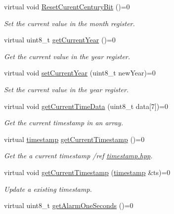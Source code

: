 \begin{DoxyCompactItemize}
virtual void \mbox{\hyperlink{classreal_time_clock_a50e19a6b0aef44719e91e3e753da0dce}{Reset\+Curent\+Century\+Bit}} ()=0
\begin{DoxyCompactList}\small\item\em Set the current value in the month register. \end{DoxyCompactList}\item 
virtual uint8\+\_\+t \mbox{\hyperlink{classreal_time_clock_a0cb99c34e2d6a089a62c8bea760c5add}{get\+Current\+Year}} ()=0
\begin{DoxyCompactList}\small\item\em Get the current value in the year register. \end{DoxyCompactList}\item 
virtual void \mbox{\hyperlink{classreal_time_clock_a4d6e8056f52cea52bab5c635c0860c12}{set\+Current\+Year}} (uint8\+\_\+t new\+Year)=0
\begin{DoxyCompactList}\small\item\em Set the current value in the year register. \end{DoxyCompactList}\item 
virtual void \mbox{\hyperlink{classreal_time_clock_a2d1613b3cd572f62bc9faaea6a0f82f2}{get\+Current\+Time\+Data}} (uint8\+\_\+t data\mbox{[}7\mbox{]})=0
\begin{DoxyCompactList}\small\item\em Get the current timestamp in an array. \end{DoxyCompactList}\item 
virtual \mbox{\hyperlink{classtimestamp}{timestamp}} \mbox{\hyperlink{classreal_time_clock_a08a7854ef9cef638996a267a953c9b14}{get\+Current\+Timestamp}} ()=0
\begin{DoxyCompactList}\small\item\em Get the a current timestamp /ref \mbox{\hyperlink{timestamp_8hpp_source}{timestamp.\+hpp}}. \end{DoxyCompactList}\item 
virtual void \mbox{\hyperlink{classreal_time_clock_aa7402c5941b089d4e86b2af20d48b7ba}{get\+Current\+Timestamp}} (\mbox{\hyperlink{classtimestamp}{timestamp}} \&ts)=0
\begin{DoxyCompactList}\small\item\em Update a existing timestamp. \end{DoxyCompactList}\item 
virtual uint8\+\_\+t \mbox{\hyperlink{classreal_time_clock_af4ff1775432a08af7e41db135d16bf65}{get\+Alarm\+One\+Seconds}} ()=0

\end{DoxyCompactItemize}
